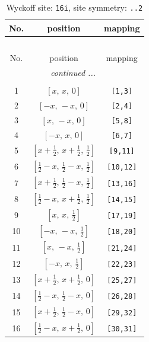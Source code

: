 \documentclass[fleqn,8pt]{jsarticle}
\begin{document}
\begin{longtable}{ccc}
\caption{Wyckoff site: {\tt 16i}, site symmetry: {\tt ..2}}
 \\
 \hline \hline
No. & position & mapping \\ \hline \endfirsthead

\multicolumn{2}{l}{\tablename\ \thetable{}} \\
 \hline \hline
No. & position & mapping \\ \hline \endhead

 \hline \hline
\multicolumn{2}{r}{\footnotesize\it continued ...} \\ \endfoot

 \hline \hline
\multicolumn{2}{r}{} \\ \endlastfoot

1 & $\left[ x,\, x,\, 0 \right]$ & {\tt [1,3]} \\ \hline
2 & $\left[ - x,\, - x,\, 0 \right]$ & {\tt [2,4]} \\ \hline
3 & $\left[ x,\, - x,\, 0 \right]$ & {\tt [5,8]} \\ \hline
4 & $\left[ - x,\, x,\, 0 \right]$ & {\tt [6,7]} \\ \hline
5 & $\left[ x + \frac{1}{2},\, x + \frac{1}{2},\, \frac{1}{2} \right]$ & {\tt [9,11]} \\ \hline
6 & $\left[ \frac{1}{2} - x,\, \frac{1}{2} - x,\, \frac{1}{2} \right]$ & {\tt [10,12]} \\ \hline
7 & $\left[ x + \frac{1}{2},\, \frac{1}{2} - x,\, \frac{1}{2} \right]$ & {\tt [13,16]} \\ \hline
8 & $\left[ \frac{1}{2} - x,\, x + \frac{1}{2},\, \frac{1}{2} \right]$ & {\tt [14,15]} \\ \hline
9 & $\left[ x,\, x,\, \frac{1}{2} \right]$ & {\tt [17,19]} \\ \hline
10 & $\left[ - x,\, - x,\, \frac{1}{2} \right]$ & {\tt [18,20]} \\ \hline
11 & $\left[ x,\, - x,\, \frac{1}{2} \right]$ & {\tt [21,24]} \\ \hline
12 & $\left[ - x,\, x,\, \frac{1}{2} \right]$ & {\tt [22,23]} \\ \hline
13 & $\left[ x + \frac{1}{2},\, x + \frac{1}{2},\, 0 \right]$ & {\tt [25,27]} \\ \hline
14 & $\left[ \frac{1}{2} - x,\, \frac{1}{2} - x,\, 0 \right]$ & {\tt [26,28]} \\ \hline
15 & $\left[ x + \frac{1}{2},\, \frac{1}{2} - x,\, 0 \right]$ & {\tt [29,32]} \\ \hline
16 & $\left[ \frac{1}{2} - x,\, x + \frac{1}{2},\, 0 \right]$ & {\tt [30,31]} \\
\end{longtable}
\end{document}
